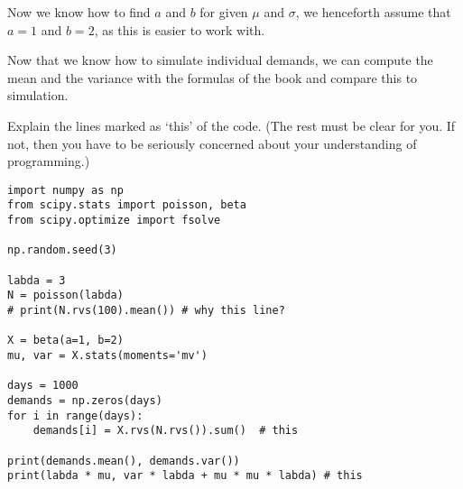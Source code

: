 Now we know how to find $a$ and $b$ for given $\mu$ and $\sigma$, we henceforth assume that $a=1$ and $b=2$, as this is easier to work with.

\begin{exercise}
Now that we know how to simulate individual demands, we can compute the mean and the variance with the formulas of the book and compare this to simulation.

Explain the lines marked as `this' of the code. (The rest must be clear for you. If not, then you have to be seriously concerned about your understanding of programming.)

\begin{verbatim}
import numpy as np
from scipy.stats import poisson, beta
from scipy.optimize import fsolve

np.random.seed(3)

labda = 3
N = poisson(labda)
# print(N.rvs(100).mean()) # why this line?

X = beta(a=1, b=2)
mu, var = X.stats(moments='mv')

days = 1000
demands = np.zeros(days)
for i in range(days):
    demands[i] = X.rvs(N.rvs()).sum()  # this

print(demands.mean(), demands.var())
print(labda * mu, var * labda + mu * mu * labda) # this
\end{verbatim}
\end{exercise}


